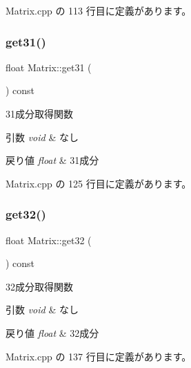  Matrix.\+cpp の 113 行目に定義があります。

\mbox{\label{class_matrix_ad6b745b0d0b3602fb3bb2bcadba85bad}} 
\subsubsection{\texorpdfstring{get31()}{get31()}}
{\footnotesize\ttfamily float Matrix\+::get31 (\begin{DoxyParamCaption}{ }\end{DoxyParamCaption}) const}



31成分取得関数 


\begin{DoxyParams}{引数}
{\em void} & なし \\
\hline
\end{DoxyParams}

\begin{DoxyRetVals}{戻り値}
{\em float} & 31成分 \\
\hline
\end{DoxyRetVals}


 Matrix.\+cpp の 125 行目に定義があります。

\mbox{\label{class_matrix_a99786d344646aacf1391118e1968850b}} 
\subsubsection{\texorpdfstring{get32()}{get32()}}
{\footnotesize\ttfamily float Matrix\+::get32 (\begin{DoxyParamCaption}{ }\end{DoxyParamCaption}) const}



32成分取得関数 


\begin{DoxyParams}{引数}
{\em void} & なし \\
\hline
\end{DoxyParams}

\begin{DoxyRetVals}{戻り値}
{\em float} & 32成分 \\
\hline
\end{DoxyRetVals}


 Matrix.\+cpp の 137 行目に定義があります。

